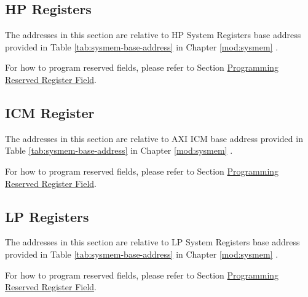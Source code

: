 \documentclass[main\_\_EN.tex]{subfiles}
\begin{document}
\subsection{HP Registers}

The addresses in this section are relative to HP System Registers base address provided in Table \ref{tab:sysmem-base-address} in Chapter \ref{mod:sysmem} \textit{}.

For how to program reserved fields, please refer to Section \hyperref[programming-reserved-field]{Programming Reserved Register Field}.



\newpage

\subsection{ICM Register}

The addresses in this section are relative to AXI ICM base address provided in Table \ref{tab:sysmem-base-address} in Chapter \ref{mod:sysmem} \textit{}.

For how to program reserved fields, please refer to Section \hyperref[programming-reserved-field]{Programming Reserved Register Field}.



\newpage
\subsection{LP Registers}

The addresses in this section are relative to LP System Registers base address provided in Table \ref{tab:sysmem-base-address} in Chapter \ref{mod:sysmem} \textit{}.

For how to program reserved fields, please refer to Section \hyperref[programming-reserved-field]{Programming Reserved Register Field}.


\end{document}
